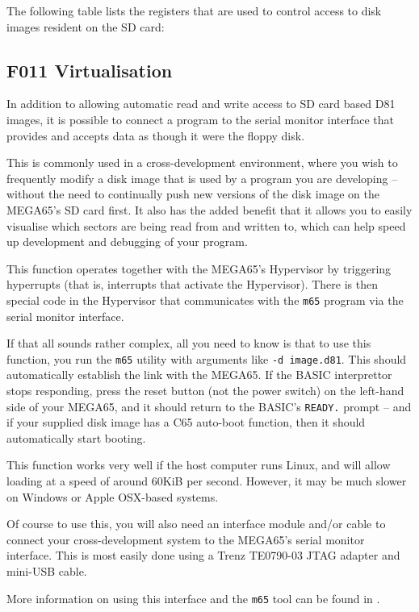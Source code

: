The following table lists the registers that are used to control
access to disk images resident on the SD card:



\subsection{F011 Virtualisation}

In addition to allowing automatic read and write access to SD card
based D81 images, it is possible to connect a program to the serial
monitor interface that provides and accepts data as though it were the
floppy disk.

This is commonly used in a cross-development
environment, where you wish to frequently modify a disk image that is
used by a program you are developing -- without the need to
continually push new versions of the disk image on the MEGA65's
SD card first. It also has the added benefit that it allows you to
easily visualise which sectors are being read from and written to,
which can help speed up development and debugging of your program.

This function operates together with the MEGA65's Hypervisor by
triggering hyperrupts (that is, interrupts that activate the
Hypervisor).  There is then special code in the Hypervisor that
communicates with the {\tt m65} program via the serial monitor
interface.

If that all sounds rather complex, all you need to know is that to use
this function, you run the {\tt m65} utility with arguments like
{\tt -d image.d81}.  This should automatically establish the link with
the MEGA65.  If the BASIC interprettor stops responding, press the
reset button (not the power switch) on the left-hand side of your MEGA65,
and it should return to the BASIC's {\tt READY.} prompt -- and if your
supplied disk image has a C65 auto-boot function, then it should
automatically start booting.

This function works very well if the host computer runs Linux, and
will allow loading at a speed of around 60KiB per second.  However, it
may be much slower on Windows or Apple OSX-based systems.

Of course to use this, you will also need an interface module and/or
cable to connect your cross-development system to the MEGA65's serial
monitor interface. This is most easily done using a Trenz TE0790-03
JTAG adapter and mini-USB cable.

More information on using this interface and the {\tt m65} tool can be
found in .

